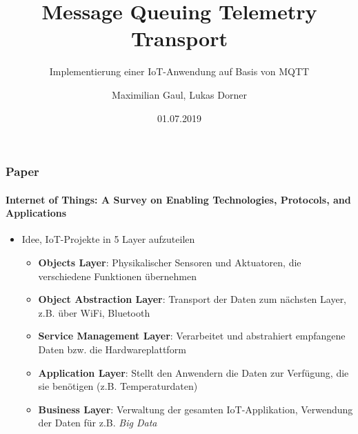 \documentclass{beamer}
\title{Message Queuing Telemetry Transport}
\subtitle{Implementierung einer IoT-Anwendung auf Basis von MQTT}
\author{Maximilian Gaul, Lukas Dorner}
\date{01.07.2019}
\begin{document}
	
\begin{frame}
	\titlepage
\end{frame}

\begin{frame}

\frametitle{Paper}
\framesubtitle{Internet of Things: A Survey on Enabling Technologies, Protocols, and Applications}
\begin{itemize}
	\item Idee, IoT-Projekte in 5 Layer aufzuteilen
	\begin{itemize}
		\item \textbf{Objects Layer}: Physikalischer Sensoren und Aktuatoren, die verschiedene Funktionen übernehmen \textcolor{black!30!green}{\checkmark}
		\item \textbf{Object Abstraction Layer}: Transport der Daten zum nächsten Layer, z.B. über WiFi, Bluetooth \textcolor{black!30!green}{\checkmark}
		\item \textbf{Service Management Layer}: Verarbeitet und abstrahiert empfangene Daten bzw. die Hardwareplattform \textcolor{black!30!green}{\checkmark}
		\item \textbf{Application Layer}: Stellt den Anwendern die Daten zur Verfügung, die sie benötigen (z.B. Temperaturdaten)
		\item \textbf{Business Layer}: Verwaltung der gesamten IoT-Applikation, Verwendung der Daten für z.B. \textit{Big Data}
	\end{itemize}
\end{itemize}

\end{frame}
\end{document}
